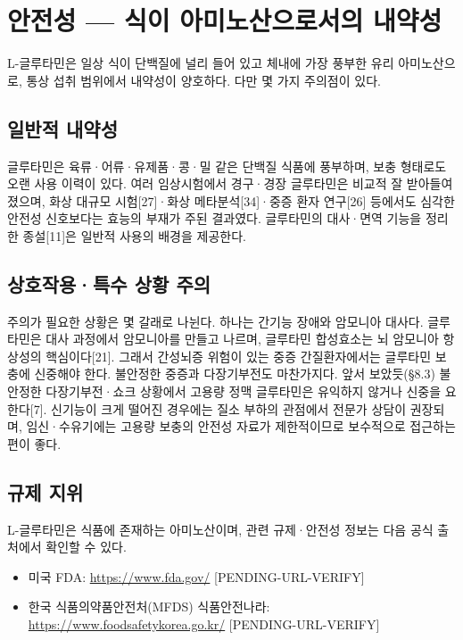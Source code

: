 \documentclass[12pt,oneside]{book}
\begin{document}
\section{안전성 — 식이 아미노산으로서의 내약성}

L-글루타민은 일상 식이 단백질에 널리 들어 있고 체내에 가장 풍부한 유리 아미노산으로, 통상 섭취 범위에서 내약성이 양호하다. 다만 몇 가지 주의점이 있다.

\subsection{일반적 내약성}

글루타민은 육류·어류·유제품·콩·밀 같은 단백질 식품에 풍부하며, 보충 형태로도 오랜 사용 이력이 있다. 여러 임상시험에서 경구·경장 글루타민은 비교적 잘 받아들여졌으며, 화상 대규모 시험[27]·화상 메타분석[34]·중증 환자 연구[26] 등에서도 심각한 안전성 신호보다는 효능의 부재가 주된 결과였다. 글루타민의 대사·면역 기능을 정리한 종설[11]은 일반적 사용의 배경을 제공한다.

\subsection{상호작용·특수 상황 주의}

주의가 필요한 상황은 몇 갈래로 나뉜다. 하나는 간기능 장애와 암모니아 대사다. 글루타민은 대사 과정에서 암모니아를 만들고 나르며, 글루타민 합성효소는 뇌 암모니아 항상성의 핵심이다[21]. 그래서 간성뇌증 위험이 있는 중증 간질환자에서는 글루타민 보충에 신중해야 한다. 불안정한 중증과 다장기부전도 마찬가지다. 앞서 보았듯(§8.3) 불안정한 다장기부전·쇼크 상황에서 고용량 정맥 글루타민은 유익하지 않거나 신중을 요한다[7]. 신기능이 크게 떨어진 경우에는 질소 부하의 관점에서 전문가 상담이 권장되며, 임신·수유기에는 고용량 보충의 안전성 자료가 제한적이므로 보수적으로 접근하는 편이 좋다.

\subsection{규제 지위}

L-글루타민은 식품에 존재하는 아미노산이며, 관련 규제·안전성 정보는 다음 공식 출처에서 확인할 수 있다.

\begin{itemize}[leftmargin=6mm,itemsep=1pt,topsep=2pt]
  \item 미국 FDA: \url{https://www.fda.gov/} [PENDING-URL-VERIFY]
  \item 한국 식품의약품안전처(MFDS) 식품안전나라: \url{https://www.foodsafetykorea.go.kr/} [PENDING-URL-VERIFY]
\end{itemize}
\end{document}
